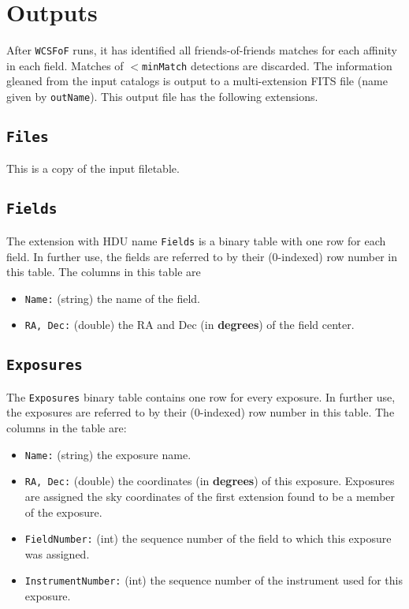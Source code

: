 \documentclass[11pt,preprint,flushrt]{aastex}
\begin{document}
\section{Outputs}
After {\tt WCSFoF} runs, it has identified all friends-of-friends matches for each affinity in each field.  Matches of $<${\tt minMatch} detections are discarded.  The information gleaned from the input catalogs is output to a multi-extension FITS file (name given by {\tt outName}).  This output file has the following extensions.

\subsection{\tt Files}
This is a copy of the input filetable.

\subsection{\tt Fields}
The extension with HDU name {\tt Fields} is a binary table with one row for each field.  In further use, the fields are referred to by their (0-indexed) row number in this table. 
The columns in this table are
\begin{itemize}
\item {\tt Name:} (string) the name of the field.
\item {\tt RA, Dec:} (double) the RA and Dec (in {\bf degrees}) of the field center.
\end{itemize}


\subsection{\tt Exposures}
The {\tt Exposures} binary table contains one row for every exposure.  In further use, the exposures are referred to by their (0-indexed) row number in this table.  The columns in the table are:
\begin{itemize}
\item {\tt Name:} (string) the exposure name.
\item {\tt RA, Dec:} (double) the coordinates (in {\bf degrees}) of this exposure.  Exposures are assigned the sky coordinates of the first extension found to be a member of the exposure.
\item {\tt FieldNumber:} (int) the sequence number of the field to which this exposure was assigned.
\item {\tt InstrumentNumber:} (int) the sequence number of the instrument used for this exposure.
\end{itemize}
\end{document}
